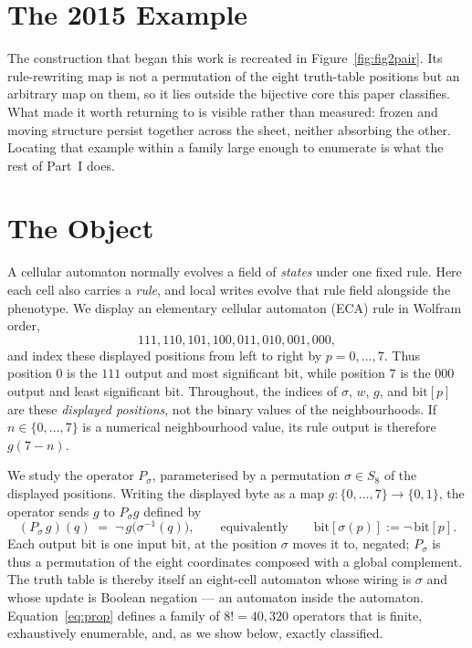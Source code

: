 \documentclass[man,12pt,floatsintext,donotrepeattitle]{apa7}
\newcommand{\sig}{\sigma}
\newcommand{\bit}[1]{\mathrm{bit}[#1]}
\begin{document}
\section{The 2015 Example}
\label{sec:warmup}

The construction that began this work is recreated in Figure~\ref{fig:fig2pair}. Its
rule-rewriting map is not a permutation of the eight truth-table positions but an
arbitrary map on them, so it lies outside the bijective core this paper classifies. What
made it worth returning to is visible rather than measured: frozen and moving structure
persist together across the sheet, neither absorbing the other. Locating that example
within a family large enough to enumerate is what the rest of Part~I does.

\section{The Object}
\label{sec:object}

A cellular automaton normally evolves a field of \emph{states} under one
fixed rule. Here each cell also carries a \emph{rule}, and local writes evolve
that rule field alongside the phenotype. We display an elementary cellular
automaton (ECA) rule in Wolfram order,
\[
111,110,101,100,011,010,001,000,
\]
and index these displayed positions from left to right by $p=0,\ldots,7$.
Thus position $0$ is the $111$ output and most significant bit, while position
$7$ is the $000$ output and least significant bit. Throughout, the indices of
$\sig$, $w$, $g$, and $\bit{p}$ are these \emph{displayed positions}, not the
binary values of the neighbourhoods. If $n\in\{0,\ldots,7\}$ is a numerical
neighbourhood value, its rule output is therefore $g(7-n)$.

We study the operator $P_\sig$, parameterised by a permutation
$\sig\in S_8$ of the displayed positions. Writing the displayed byte as a map
$g\colon\{0,\dots,7\}\to\{0,1\}$, the operator sends $g$ to $P_\sig g$ defined by
\begin{equation}
(P_\sig\, g)(q) \;=\; \lnot\, g\bigl(\sig^{-1}(q)\bigr),
\qquad\text{equivalently}\qquad \bit{\sig(p)} := \lnot\,\bit{p}.
\label{eq:prop}
\end{equation}
Each output bit is one input bit, at the position $\sig$ moves it to, negated;
$P_\sig$ is thus a permutation of the eight coordinates composed with a global
complement. The truth table is thereby itself an eight-cell automaton whose
wiring is $\sig$ and whose update is Boolean negation --- an automaton inside
the automaton. Equation~\eqref{eq:prop} defines a family of $8! = 40{,}320$
operators that is finite, exhaustively enumerable, and, as we show below,
exactly classified.
\end{document}
